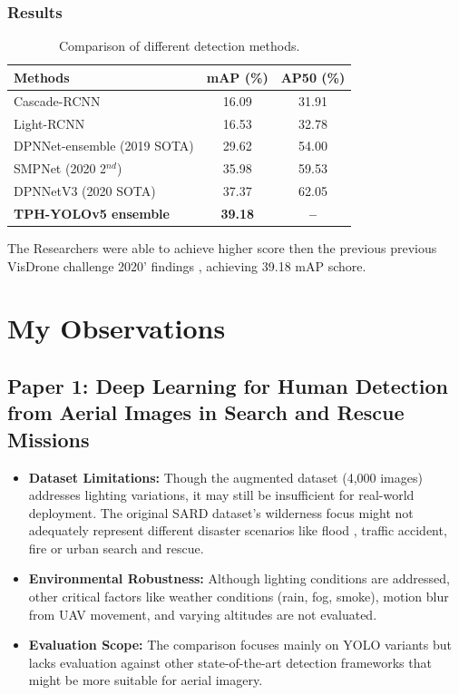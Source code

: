 \documentclass[12pt,a4paper]{report}
\begin{document}
\subsection{Results}


\begin{table}[h!]
\centering
\caption{Comparison of different detection methods.}
\begin{tabular}{lcc}
\hline
\textbf{Methods} & \textbf{mAP (\%)} & \textbf{AP50 (\%)} \\
\hline
Cascade-RCNN\cite{cascade} & 16.09 & 31.91 \\
Light-RCNN\cite{lightrcnn} & 16.53 & 32.78 \\
\hline
DPNNet-ensemble (2019 SOTA)\cite{dpnnet} & 29.62 & 54.00 \\
SMPNet (2020 2$^{nd}$)\cite{smpnet} & 35.98 & 59.53 \\
DPNNetV3 (2020 SOTA)\cite{dpnnetv3} & 37.37 & 62.05 \\
\textbf{TPH-YOLOv5 ensemble} & \textbf{39.18} & \textbf{--} \\
\hline
\end{tabular}
\end{table}
The Researchers were able to achieve higher score then the previous previous VisDrone challenge 2020' findings , achieving 39.18 mAP schore. 



\chapter{My Observations}

\section{Paper 1: Deep Learning for Human Detection from Aerial Images in Search and Rescue Missions}

\begin{itemize}
\item \textbf{Dataset Limitations:} Though the augmented dataset (4,000 images) addresses lighting variations, it may still be insufficient for real-world deployment. The original SARD dataset's wilderness focus might not adequately represent different disaster scenarios like flood , traffic accident, fire or urban search and rescue. 

\item \textbf{Environmental Robustness:} Although lighting conditions are addressed, other critical factors like weather conditions (rain, fog, smoke), motion blur from UAV movement, and varying altitudes are not evaluated.

\item \textbf{Evaluation Scope:} The comparison focuses mainly on YOLO variants but lacks evaluation against other state-of-the-art detection frameworks that might be more suitable for aerial imagery.

\end{itemize}
\end{document}
